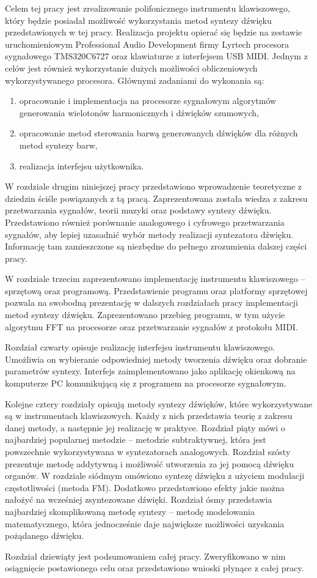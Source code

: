 Celem tej pracy jest zrealizowanie polifonicznego instrumentu klawiszowego, który będzie posiadał możliwość wykorzystania metod syntezy dźwięku przedstawionych w tej pracy. Realizacja projektu opierać się będzie na zestawie uruchomieniowym Professional Audio Development firmy Lyrtech procesora sygnałowego TMS320C6727 oraz klawiaturze z interfejsem USB MIDI. Jednym z celów jest również wykorzystanie dużych możliwości obliczeniowych wykorzystywanego procesora. Głównymi zadaniami do wykonania są:

\begin{enumerate}
    \item opracowanie i implementacja na procesorze sygnałowym algorytmów generowania 	wielotonów harmonicznych i dźwięków szumowych,
    
    \item opracowanie metod sterowania barwą generowanych dźwięków dla różnych metod syntezy 	barw,
    
    \item realizacja interfejsu użytkownika.
\end{enumerate}

W rozdziale drugim niniejszej pracy przedstawiono wprowadzenie teoretyczne z dziedzin ściśle powiązanych z tą pracą. Zaprezentowana została wiedza z zakresu przetwarzania sygnałów, teorii muzyki oraz podstawy syntezy dźwięku. Przedstawiono również porównanie analogowego i cyfrowego przetwarzania sygnałów, aby lepiej uzasadnić wybór metody realizacji syntezatora dźwięku. Informację tam zamieszczone są niezbędne do pełnego zrozumienia dalszej części pracy.

W rozdziale trzecim zaprezentowano implementację instrumentu klawiszowego – sprzętową oraz programową. Przedstawienie programu oraz platformy sprzętowej pozwala na swobodną prezentację w dalszych rozdziałach pracy implementacji metod syntezy dźwięku. Zaprezentowano przebieg programu, w tym użycie algorytmu FFT na procesorze oraz przetwarzanie sygnałów z protokołu MIDI.

Rozdział czwarty opisuje realizację interfejsu instrumentu klawiszowego. Umożliwia on wybieranie odpowiedniej metody tworzenia dźwięku oraz dobranie parametrów syntezy. Interfejs zaimplementowano jako aplikację okienkową na komputerze PC komunikującą się z programem na procesorze sygnałowym.

Kolejne cztery rozdziały opisują metody syntezy dźwięków, które wykorzystywane są w instrumentach klawiszowych. Każdy z nich przedstawia teorię z zakresu danej metody, a następnie jej realizację w praktyce. Rozdział piąty mówi o najbardziej popularnej metodzie – metodzie subtraktywnej, która jest powszechnie wykorzystywana w syntezatorach analogowych. Rozdział szósty prezentuje metodę addytywną i możliwość utworzenia za jej pomocą dźwięku organów. W rozdziale siódmym omówiono syntezę dźwięku z użyciem modulacji częstotliwości (metoda FM). Dodatkowo przedstawiono efekty jakie można nałożyć na wcześniej zsyntezowane dźwięki. Rozdział ósmy przedstawia najbardziej skomplikowaną metodę syntezy – metodę modelowania matematycznego, która jednocześnie daje największe możliwości uzyskania pożądanego dźwięku.

Rozdział dziewiąty jest podsumowaniem całej pracy. Zweryfikowano w nim osiągnięcie postawionego celu oraz przedstawiono wnioski płynące z całej pracy.